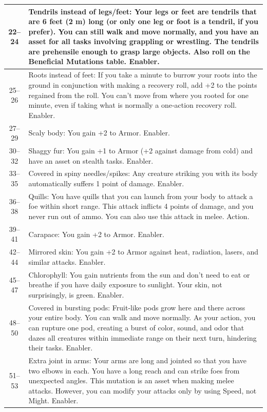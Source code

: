 \begin{longtable}{| c | p{15cm} |}
22–24 & Tendrils instead of legs/feet: Your legs or feet are tendrils that are 6 feet (2 m) long (or only one leg or foot is a tendril, if you prefer). You can still walk and move normally, and you have an asset for all tasks involving grappling or wrestling. The tendrils are prehensile enough to grasp large objects. Also roll on the Beneficial Mutations table. Enabler. \\ \hline
25–26 & Roots instead of feet: If you take a minute to burrow your roots into the ground in conjunction with making a recovery roll, add +2 to the points regained from the roll. You can’t move from where you rooted for one minute, even if taking what is normally a one‑action recovery roll. Enabler. \\ \hline
27–29 & Scaly body: You gain +2 to Armor. Enabler. \\ \hline
30–32 & Shaggy fur: You gain +1 to Armor (+2 against damage from cold) and have an asset on stealth tasks. Enabler. \\ \hline
33–35 & Covered in spiny needles/spikes: Any creature striking you with its body automatically suffers 1 point of damage. Enabler. \\ \hline
36–38 & Quills: You have quills that you can launch from your body to attack a foe within short range. This attack inflicts 4 points of damage, and you never run out of ammo. You can also use this attack in melee. Action. \\ \hline
39–41 & Carapace: You gain +2 to Armor. Enabler. \\ \hline
42–44 & Mirrored skin: You gain +2 to Armor against heat, radiation, lasers, and similar attacks. Enabler. \\ \hline
45–47 & Chlorophyll: You gain nutrients from the sun and don’t need to eat or breathe if you have daily exposure to sunlight. Your skin, not surprisingly, is green. Enabler. \\ \hline
48–50 & Covered in bursting pods: Fruit‑like pods grow here and there across your entire body. You can walk and move normally. As your action, you can rupture one pod, creating a burst of color, sound, and odor that dazes all creatures within immediate range on their next turn, hindering their tasks. Enabler. \\ \hline
51–53 & Extra joint in arms: Your arms are long and jointed so that you have two elbows in each. You have a long reach and can strike foes from unexpected angles. This mutation is an asset when making melee attacks. However, you can modify your attacks only by using Speed, not Might. Enabler. \\ \hline

\end{longtable}
